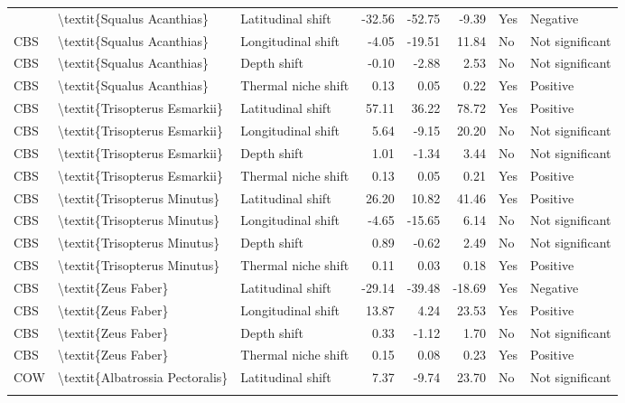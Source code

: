 \begin{longtable}[t]{lllrrrll}
{{\addlinespace
CBS & \textbackslash{}textit\{Squalus Acanthias\} & Latitudinal shift & -32.56 & -52.75 & -9.39 & Yes & Negative\\
CBS & \textbackslash{}textit\{Squalus Acanthias\} & Longitudinal shift & -4.05 & -19.51 & 11.84 & No & Not significant\\
CBS & \textbackslash{}textit\{Squalus Acanthias\} & Depth shift & -0.10 & -2.88 & 2.53 & No & Not significant\\
CBS & \textbackslash{}textit\{Squalus Acanthias\} & Thermal niche shift & 0.13 & 0.05 & 0.22 & Yes & Positive\\
CBS & \textbackslash{}textit\{Trisopterus Esmarkii\} & Latitudinal shift & 57.11 & 36.22 & 78.72 & Yes & Positive\\
\addlinespace
CBS & \textbackslash{}textit\{Trisopterus Esmarkii\} & Longitudinal shift & 5.64 & -9.15 & 20.20 & No & Not significant\\
CBS & \textbackslash{}textit\{Trisopterus Esmarkii\} & Depth shift & 1.01 & -1.34 & 3.44 & No & Not significant\\
CBS & \textbackslash{}textit\{Trisopterus Esmarkii\} & Thermal niche shift & 0.13 & 0.05 & 0.21 & Yes & Positive\\
CBS & \textbackslash{}textit\{Trisopterus Minutus\} & Latitudinal shift & 26.20 & 10.82 & 41.46 & Yes & Positive\\
CBS & \textbackslash{}textit\{Trisopterus Minutus\} & Longitudinal shift & -4.65 & -15.65 & 6.14 & No & Not significant\\
\addlinespace
CBS & \textbackslash{}textit\{Trisopterus Minutus\} & Depth shift & 0.89 & -0.62 & 2.49 & No & Not significant\\
CBS & \textbackslash{}textit\{Trisopterus Minutus\} & Thermal niche shift & 0.11 & 0.03 & 0.18 & Yes & Positive\\
CBS & \textbackslash{}textit\{Zeus Faber\} & Latitudinal shift & -29.14 & -39.48 & -18.69 & Yes & Negative\\
CBS & \textbackslash{}textit\{Zeus Faber\} & Longitudinal shift & 13.87 & 4.24 & 23.53 & Yes & Positive\\
CBS & \textbackslash{}textit\{Zeus Faber\} & Depth shift & 0.33 & -1.12 & 1.70 & No & Not significant\\
\addlinespace
CBS & \textbackslash{}textit\{Zeus Faber\} & Thermal niche shift & 0.15 & 0.08 & 0.23 & Yes & Positive\\
COW & \textbackslash{}textit\{Albatrossia Pectoralis\} & Latitudinal shift & 7.37 & -9.74 & 23.70 & No & Not significant\\
}}
\end{longtable}
